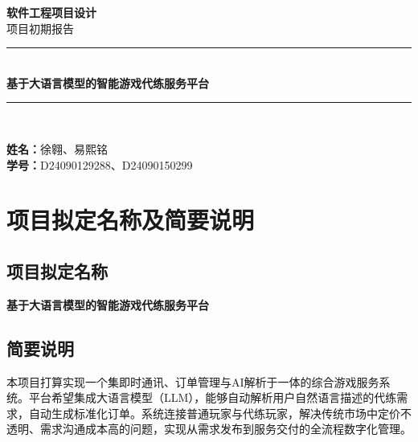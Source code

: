\documentclass[12pt,a4paper]{article}
\begin{document}
\begin{titlepage}
    \centering
    \vspace*{3cm}
    
    {\Huge \bfseries 软件工程项目设计}\\[0.8cm]
    {\LARGE 项目初期报告}\\[2.5cm]
    
    \rule{0.8\textwidth}{1.5pt}\\[0.6cm]
    {\huge \bfseries 基于大语言模型的智能游戏代练服务平台}\\[0.2cm]
    \rule{0.8\textwidth}{1.5pt}\\[2.5cm]
    
    \begin{flushleft}
    \hspace{4cm}
    \large
    \textbf{姓名：}徐翱、易熙铭\\
    \vspace{0.3cm}
    \hspace{4cm}
    \textbf{学号：}D24090129288、D24090150299\\
    \end{flushleft}
    
    \vfill
\end{titlepage}

\tableofcontents
\newpage

\section{项目拟定名称及简要说明}

\subsection{项目拟定名称}
\textbf{基于大语言模型的智能游戏代练服务平台}

\subsection{简要说明}
本项目打算实现一个集即时通讯、订单管理与AI解析于一体的综合游戏服务系统。平台希望集成大语言模型（LLM），能够自动解析用户自然语言描述的代练需求，自动生成标准化订单。系统连接普通玩家与代练玩家，解决传统市场中定价不透明、需求沟通成本高的问题，实现从需求发布到服务交付的全流程数字化管理。
\end{document}
